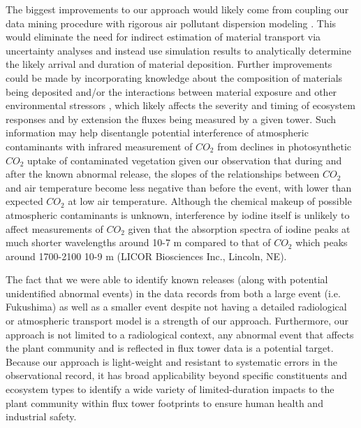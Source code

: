 \documentclass{article}
\begin{document}
The biggest improvements to our approach would likely come from coupling our data mining procedure with rigorous air pollutant dispersion modeling \cite[e.g.,][]{meszarosPredictabilityDispersionFukushimaderived2016}. This would eliminate the need for indirect estimation of material transport via uncertainty analyses and instead use simulation results to analytically determine the likely arrival and duration of material deposition. Further improvements could be made by incorporating knowledge about the composition of materials being deposited \citep{international2006iaea, meszarosPredictabilityDispersionFukushimaderived2016} and/or the interactions between material exposure and other environmental stressors \citep{mousseauPlantsLightIonizing2020}, which likely affects the severity and timing of ecosystem responses and by extension the fluxes being measured by a given tower. Such information may help disentangle potential interference of atmospheric contaminants with infrared measurement of $CO_2$ from declines in photosynthetic $CO_2$ uptake of contaminated vegetation given our observation that during and after the known abnormal release, the slopes of the relationships between $CO_2$ and air temperature become less negative than before the event, with lower than expected $CO_2$ at low air temperature. Although the chemical makeup of possible atmospheric contaminants is unknown, interference by iodine itself is unlikely to affect measurements of $CO_2$ given that the absorption spectra of iodine peaks at much shorter wavelengths around 10-7 m \citep{haynes2016crc} compared to that of $CO_2$ which peaks around 1700-2100 10-9 m (LICOR Biosciences Inc., Lincoln, NE).

The fact that we were able to identify known releases (along with potential unidentified abnormal events) in the data records from both a large event (i.e. Fukushima) as well as a smaller event despite not having a detailed radiological or atmospheric transport model is a strength of our approach. Furthermore, our approach is not limited to a radiological context, any abnormal event that affects the plant community and is reflected in flux tower data is a potential target. Because our approach is light-weight and resistant to systematic errors in the observational record, it has broad applicability beyond specific constituents and ecosystem types to identify a wide variety of limited-duration impacts to the plant community within flux tower footprints to ensure human health and industrial safety.



\end{document}
